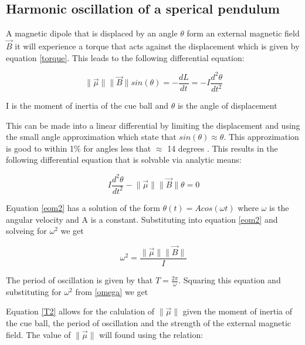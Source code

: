 \documentclass[twocolumn,secnumarabic,amssymb, nobibnotes, aps, pra]{revtex4}
\newcommand{\norm}[1]{\lVert#1\rVert}
\begin{document}
\subsection{Harmonic oscillation of a sperical pendulum}

A magnetic dipole that is displaced by an angle $\theta$ form an external magnetic field $\vec{B}$ it will experience a torque that acts against the displacement which is given by equation \ref{torque}.  This leads to the following differential equation:

\begin{mycapequ}[!ht]
\begin{equation}
\norm{\vec{\mu}} \norm{\vec{B}} sin(\theta) = -\frac{dL}{dt} = -I\frac{d^2\theta}{dt^2}
\label{eom1}   %
\end{equation}  
\caption{I is the moment of inertia of the cue ball and $\theta$ is the angle of displacement}
\end{mycapequ}

This can be made into a linear differential by limiting the displacement and using the small angle approximation which state that $sin(\theta) \approx \theta$.  This approzimation is good to within 1\% for angles less that $\approx$ 14 degrees \cite{mcalister1}.  This results in the following differential equation that is solvable via analytic means:

\begin{equation}
I\frac{d^2\theta}{dt^2} - \norm{\vec{\mu}} \norm{\vec{B}} \theta = 0
\label{eom2}   %
\end{equation}  

Equation \ref{eom2} has a solution of the form $\theta(t) = Acos(\omega t)$ where $\omega$ is the angular velocity and A is a constant.  Substituting into equation \ref{eom2} and solveing for $\omega^2$ we get 

\begin{equation}
\omega^2 = \frac{\norm{\vec{\mu}}\norm{\vec{B}}}{I}
\label{omega}   %
\end{equation} 

The period of oscillation is given by that $T = \frac{2\pi}{\omega}$.  Squaring this equation and substituting for $\omega^2$ from \ref{omega} we get

Equation \ref{T2} allows for the calulation of $\norm{\vec{\mu}}$ given the moment of inertia of the cue ball, the period of oscillation and the strength of the external magnetic field.  The value of $\norm{\vec{\mu}}$ will found using the relation:
\end{document}
